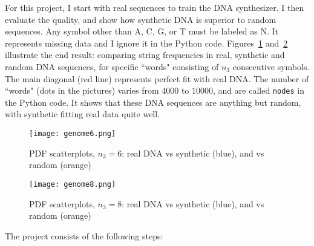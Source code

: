 \documentclass[oneside,10pt]{book}
\begin{document}
\noindent For this project, I start with real sequences to train the DNA synthesizer. I then evaluate the quality, and show how synthetic DNA  is superior to random sequences. Any symbol other than A, C, G, or T must be labeled as N. It represents missing data and I ignore it in the Python code. Figures~\ref{rinyltualoer} and~\ref{fcasswelbwacxd} illustrate the end result: comparing string frequencies
 in real, synthetic and random DNA sequences, for specific ``words" consisting of $n_3$ consecutive symbols. The main diagonal (red line) represents perfect fit  with real DNA. The number of ``words" (dots in the pictures) varies from $\num{4000}$ to $\num{10000}$, and are called
 \texttt{nodes} in the Python code. It shows that these DNA sequences are anything but random, with synthetic fitting real data quite well.

\begin{figure}[H]
\centering
\texttt{[image: genome6.png]}   
\caption{PDF scatterplots, $n_3=6$: real DNA vs synthetic (blue), and vs random (orange)}
\label{rinyltualoer}
\end{figure}


\begin{figure}[H]
\centering
\texttt{[image: genome8.png]}   
\caption{PDF scatterplots, $n_3=8$: real DNA vs synthetic (blue), and vs random (orange)}
\label{fcasswelbwacxd}
\end{figure}

\noindent The project consists of the following steps: \vspace{1ex}
\end{document}
